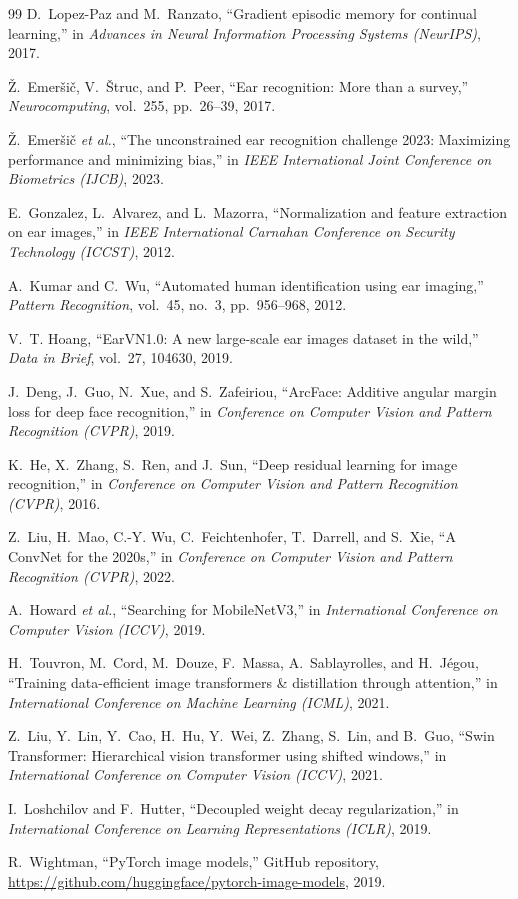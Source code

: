 \documentclass[12pt,a4paper]{report}
\begin{document}
\begin{thebibliography}{99}
D.~Lopez-Paz and M.~Ranzato, ``Gradient episodic memory for continual learning,'' in \emph{Advances in Neural Information Processing Systems (NeurIPS)}, 2017.

{\v Z}.~Emer{\v s}i{\v c}, V.~{\v S}truc, and P.~Peer, ``Ear recognition: More than a survey,'' \emph{Neurocomputing}, vol.~255, pp.~26--39, 2017.

{\v Z}.~Emer{\v s}i{\v c} \emph{et al.}, ``The unconstrained ear recognition challenge 2023: Maximizing performance and minimizing bias,'' in \emph{IEEE International Joint Conference on Biometrics (IJCB)}, 2023.

E.~Gonzalez, L.~Alvarez, and L.~Mazorra, ``Normalization and feature extraction on ear images,'' in \emph{IEEE International Carnahan Conference on Security Technology (ICCST)}, 2012.

A.~Kumar and C.~Wu, ``Automated human identification using ear imaging,'' \emph{Pattern Recognition}, vol.~45, no.~3, pp.~956--968, 2012.

V.~T. Hoang, ``EarVN1.0: A new large-scale ear images dataset in the wild,'' \emph{Data in Brief}, vol.~27, 104630, 2019.

J.~Deng, J.~Guo, N.~Xue, and S.~Zafeiriou, ``ArcFace: Additive angular margin loss for deep face recognition,'' in \emph{Conference on Computer Vision and Pattern Recognition (CVPR)}, 2019.

K.~He, X.~Zhang, S.~Ren, and J.~Sun, ``Deep residual learning for image recognition,'' in \emph{Conference on Computer Vision and Pattern Recognition (CVPR)}, 2016.

Z.~Liu, H.~Mao, C.-Y. Wu, C.~Feichtenhofer, T.~Darrell, and S.~Xie, ``A ConvNet for the 2020s,'' in \emph{Conference on Computer Vision and Pattern Recognition (CVPR)}, 2022.

A.~Howard \emph{et al.}, ``Searching for MobileNetV3,'' in \emph{International Conference on Computer Vision (ICCV)}, 2019.

H.~Touvron, M.~Cord, M.~Douze, F.~Massa, A.~Sablayrolles, and H.~J{\'e}gou, ``Training data-efficient image transformers \& distillation through attention,'' in \emph{International Conference on Machine Learning (ICML)}, 2021.

Z.~Liu, Y.~Lin, Y.~Cao, H.~Hu, Y.~Wei, Z.~Zhang, S.~Lin, and B.~Guo, ``Swin Transformer: Hierarchical vision transformer using shifted windows,'' in \emph{International Conference on Computer Vision (ICCV)}, 2021.

I.~Loshchilov and F.~Hutter, ``Decoupled weight decay regularization,'' in \emph{International Conference on Learning Representations (ICLR)}, 2019.

R.~Wightman, ``PyTorch image models,'' GitHub repository, \url{https://github.com/huggingface/pytorch-image-models}, 2019.

\end{thebibliography}
\end{document}
